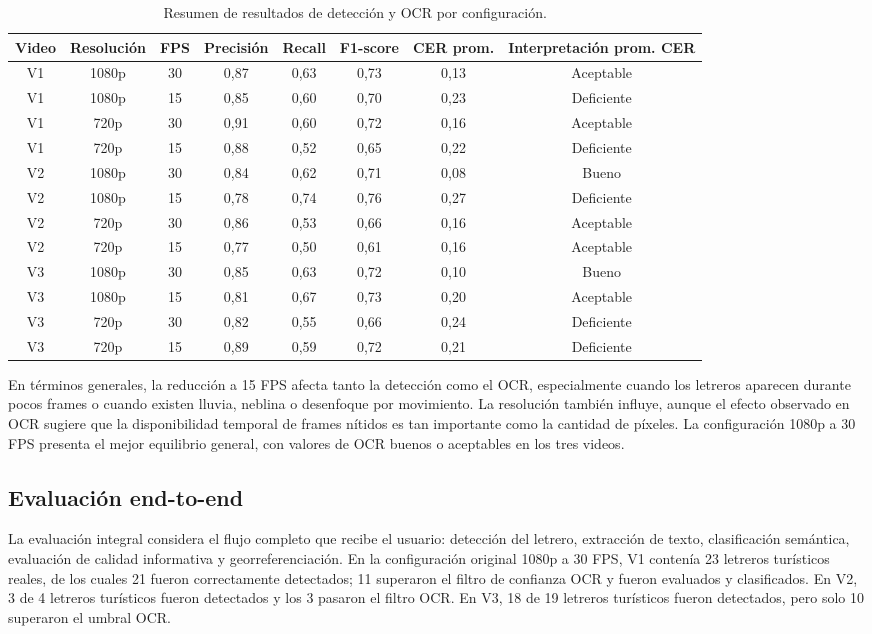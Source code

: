 \documentclass[conference]{IEEEtran}
\begin{document}
\begin{table}[!t]
\caption{Resumen de resultados de detección y OCR por configuración.}
\label{tab:resumen_resultados}
\centering
\footnotesize
\begin{tabular}{cccccccc}
\toprule
Video & Resolución & FPS & Precisión & Recall & F1-score & CER prom. & Interpretación prom. CER\\
\midrule
V1 & 1080p & 30  & 0,87 & 0,63 & 0,73 & 0,13 & Aceptable \\
V1 & 1080p & 15  & 0,85 & 0,60 & 0,70 & 0,23 & Deficiente \\
V1 & 720p & 30  & 0,91 & 0,60 & 0,72 & 0,16 & Aceptable \\
V1 & 720p & 15  & 0,88 & 0,52 & 0,65 & 0,22 & Deficiente \\
V2 & 1080p & 30  & 0,84 & 0,62 & 0,71 & 0,08 & Bueno \\
V2 & 1080p & 15  & 0,78 & 0,74 & 0,76 & 0,27 & Deficiente \\
V2 & 720p & 30  & 0,86 & 0,53 & 0,66 & 0,16 & Aceptable \\
V2 & 720p & 15  & 0,77 & 0,50 & 0,61 & 0,16 & Aceptable \\
V3 & 1080p & 30  & 0,85 & 0,63 & 0,72 & 0,10 & Bueno \\
V3 & 1080p & 15  & 0,81 & 0,67 & 0,73 & 0,20 & Aceptable \\
V3 & 720p & 30  & 0,82 & 0,55 & 0,66 & 0,24 & Deficiente \\
V3 & 720p & 15 & 0,89 & 0,59 & 0,72 & 0,21 & Deficiente \\
\bottomrule
\end{tabular}
\end{table}

En términos generales, la reducción a 15 FPS afecta tanto la detección 
como el OCR, especialmente cuando los letreros aparecen durante pocos 
frames o cuando existen lluvia, neblina o desenfoque por movimiento. La 
resolución también influye, aunque el efecto observado en OCR sugiere que 
la disponibilidad temporal de frames nítidos es tan importante como la 
cantidad de píxeles. La configuración 1080p a 30 FPS presenta el mejor 
equilibrio general, con valores de OCR buenos o aceptables en los tres 
videos.

\subsection{Evaluación end-to-end}

La evaluación integral considera el flujo completo que recibe el usuario: 
detección del letrero, extracción de texto, clasificación semántica, 
evaluación de calidad informativa y georreferenciación. En la configuración
original 1080p a 30 FPS, V1 contenía 23 letreros turísticos reales, de los
cuales 21 fueron correctamente detectados; 11 superaron el filtro de 
confianza OCR y fueron evaluados y clasificados. En V2, 3 de 4 letreros 
turísticos fueron detectados y los 3 pasaron el filtro OCR. En V3, 18 de 19
letreros turísticos fueron detectados, pero solo 10 superaron el umbral OCR.
\end{document}

